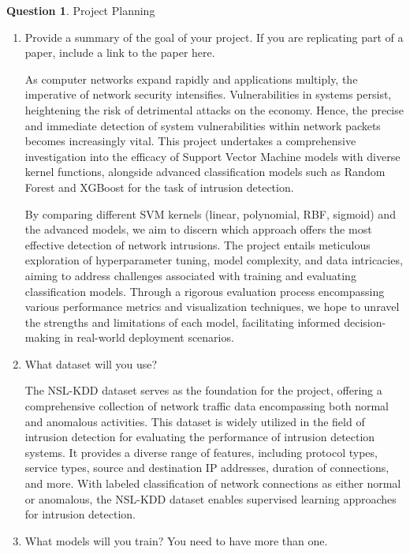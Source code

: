 \documentclass[11pt]{article}
\theoremstyle{definition}
\theoremstyle{theorem}
\newtheorem{ques}{Question}
\newcommand{\response}{\medskip\noindent{\color{DarkBlue}\textbf{Response:}}}
\begin{document}
\begin{ques} Project Planning
\end{ques}
\begin{enumerate}
\item Provide a summary of the goal of your project.  If you are replicating part of a paper, include a link to the paper here.

\response

As computer networks expand rapidly and applications multiply, the imperative of network security intensifies. Vulnerabilities in systems persist, heightening the risk of detrimental attacks on the economy. Hence, the precise and immediate detection of system vulnerabilities within network packets becomes increasingly vital. This project undertakes a comprehensive investigation into the efficacy of Support Vector Machine models with diverse kernel functions, alongside advanced classification models such as Random Forest and XGBoost for the task of intrusion detection.

By comparing different SVM kernels (linear, polynomial, RBF, sigmoid) and the advanced models, we aim to discern which approach offers the most effective detection of network intrusions. The project entails meticulous exploration of hyperparameter tuning, model complexity, and data intricacies, aiming to address challenges associated with training and evaluating classification models. Through a rigorous evaluation process encompassing various performance metrics and visualization techniques, we hope to unravel the strengths and limitations of each model, facilitating informed decision-making in real-world deployment scenarios.

\item What dataset will you use?

\response

The NSL-KDD dataset serves as the foundation for the project, offering a comprehensive collection of network traffic data encompassing both normal and anomalous activities. This dataset is widely utilized in the field of intrusion detection for evaluating the performance of intrusion detection systems. It provides a diverse range of features, including protocol types, service types, source and destination IP addresses, duration of connections, and more. With labeled classification of network connections as either normal or anomalous, the NSL-KDD dataset enables supervised learning approaches for intrusion detection.

\newpage
\item What models will you train? You need to have more than one.


\end{enumerate}
\end{document}

